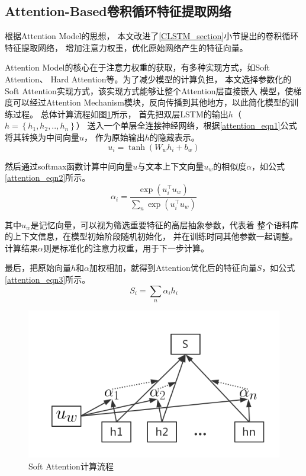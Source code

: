 \subsection{Attention-Based卷积循环特征提取网络}
根据Attention Model的思想，
本文改进了\ref{CLSTM_section}小节提出的卷积循环特征提取网络，
增加注意力权重，优化原始网络产生的特征向量。

Attention Model的核心在于注意力权重的获取，有多种实现方式，如Soft Attention、
Hard Attention等。为了减少模型的计算负担，
本文选择参数化的Soft Attention实现方式，该实现方式能够让整个Attention层直接嵌入
模型，使梯度可以经过Attention Mechanism模块，反向传播到其他地方，以此简化模型的训练过程。
总体计算流程如图\ref{Soft_Attention}所示，
首先把双层LSTM的输出$h$（$h=\left \{ h_1,h_2,..,h_n\right\}$）
送入一个单层全连接神经网络，根据\ref{attention_eqn1}公式将其转换为中间向量$u$，
作为原始输出$h$的隐藏表示。
\begin{equation}
    u_i=\tanh\left ( W_wh_i+b_w \right )
    \label{attention_eqn1}
\end{equation}

然后通过softmax函数计算中间向量$u$与文本上下文向量$u_w$的相似度$\alpha$，如公式\ref{attention_eqn2}所示。
\begin{equation}
    \alpha_i=\frac{\exp\left ( u_{i}^{\top }u_w \right )}{\sum_n\exp\left ( u_{i}^{\top }u_w \right )}
    \label{attention_eqn2}
\end{equation}

其中$u_w$是记忆向量，可以视为筛选重要特征的高层抽象参数，代表着
整个语料库的上下文信息，在模型初始阶段随机初始化，
并在训练时同其他参数一起调整。计算结果$\alpha$则是标准化的注意力权重，用于下一步计算。

最后，把原始向量$h$和$\alpha$加权相加，就得到Attention优化后的特征向量$S$，如公式\ref{attention_eqn3}所示。
\begin{equation}
    S_i=\sum_n\alpha_ih_i
    \label{attention_eqn3}
\end{equation}
\begin{figure}[h]
    \includegraphics[scale=0.5]{picture/Attention.png}
    \caption{Soft Attention计算流程}
    \label{Soft_Attention}
\end{figure}

